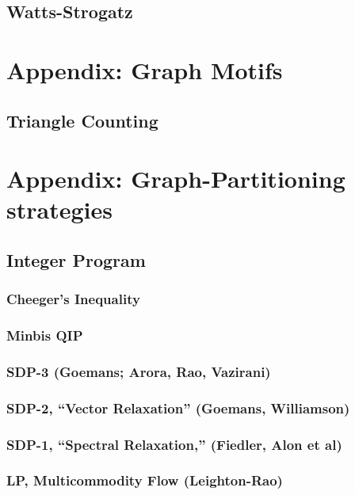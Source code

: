 \documentclass[11pt]{article}
\begin{document}
\subsection{Watts-Strogatz}
\cite{Watts1998}

\section{Appendix: Graph Motifs}
\subsection{Triangle Counting}


\section{Appendix: Graph-Partitioning strategies}

\subsection{Integer Program}
\subsubsection{Cheeger's Inequality}
\subsubsection{Minbis QIP}
\subsubsection{SDP-3 (Goemans; Arora, Rao, Vazirani)}
\cite{arora2009expander}

\subsubsection{SDP-2, ``Vector Relaxation'' (Goemans, Williamson)}
\cite{goemans1995improved}

\subsubsection{SDP-1, ``Spectral Relaxation,'' (Fiedler, Alon et al)}
\cite{alon1986eigenvalues}

\subsubsection{LP, Multicommodity Flow (Leighton-Rao)}
\cite{Leighton:1999:MMM:331524.331526}
\end{document}
